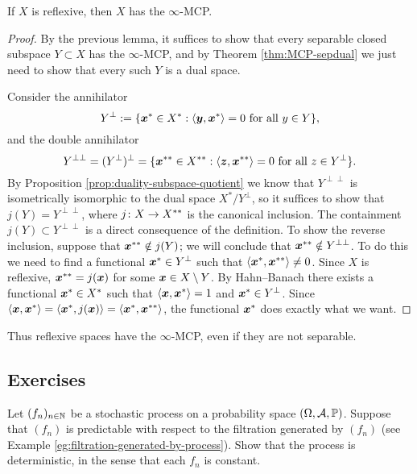 \begin{cor}\label{cor:MCP-reflexive}
  If $X$ is reflexive, then $X$ has the $\infty$-MCP.
\end{cor}

\begin{proof}
  By the previous lemma, it suffices to show that every separable closed subspace $Y \subset X$ has the $\infty$-MCP, and by Theorem \ref{thm:MCP-sepdual} we just need to show that every such $Y$ is a dual space.
  
  Consider the annihilator
  \begin{equation*}
    Y^{\perp} := \{\bm{x}^* \in X^* :  \text{$\langle \bm{y}, \bm{x}^* \rangle = 0$ for all $y \in Y$}\},
  \end{equation*}
  and the double annihilator
  \begin{equation*}
    Y^{\perp\perp} = (Y^\perp)^\perp = \{\bm{x}^{**} \in X^{**} : \text{$\langle \bm{z}, \bm{x}^{**} \rangle = 0$ for all $z \in Y^\perp$}\}.
  \end{equation*}
  By Proposition \ref{prop:duality-subspace-quotient} we know that $Y^{\perp\perp}$ is isometrically isomorphic to the dual space $X^*/Y^\perp$, so it suffices to show that $j(Y) = Y^{\perp\perp}$, where $j \colon X \rightarrow X^{**}$ is the canonical inclusion.
  The containment $j(Y) \subset Y^{\perp\perp}$ is a direct consequence of the definition.
  To show the reverse inclusion, suppose that $\bm{x}^{**} \notin j(Y)$; we will conclude that $\bm{x}^{**} \notin Y^{\perp\perp}$.
  To do this we need to find a functional $\bm{x}^* \in Y^{\perp}$ such that $\langle\bm{x}^*, \bm{x}^{**}\rangle \neq 0$.
  Since $X$ is reflexive, $\bm{x}^{**} = j(\bm{x})$ for some $\bm{x} \in X \setminus Y$.
  By Hahn--Banach there exists a functional $\bm{x}^* \in X^*$ such that $\langle \bm{x}, \bm{x}^* \rangle = 1$ and $\bm{x}^* \in Y^\perp$.
  Since $\langle \bm{x}, \bm{x}^* \rangle = \langle \bm{x}^*, j(\bm{x}) \rangle = \langle \bm{x}^*, \bm{x}^{**} \rangle$, the functional $\bm{x}^*$ does exactly what we want.
\end{proof}

Thus reflexive spaces have the $\infty$-MCP, even if they are not separable.


\subsection*{Exercises}

\begin{exercise}
  Let $(f_n)_{n \in \mathbb{N}}$ be a stochastic process on a probability space $(\Omega,\mathcal{A},\mathbb{P})$.
  Suppose that $(f_n)$ is predictable with respect to the filtration generated by $(f_n)$ (see Example \ref{eg:filtration-generated-by-process}).
  Show that the process is deterministic, in the sense that each $f_n$ is constant.
\end{exercise}

